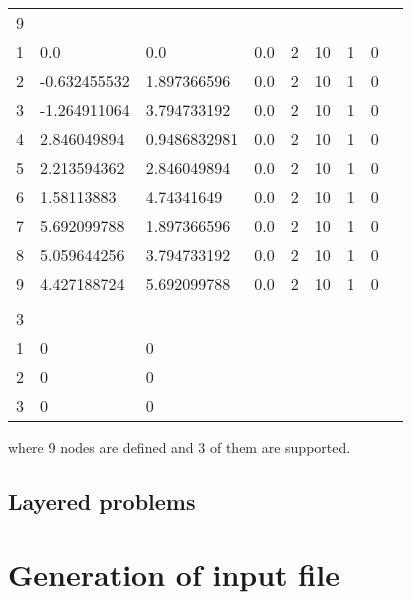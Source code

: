 \begin{center}
{\tt
\begin{tabular}{lllllllll}
9 &              &              &     &   &    &   &
\\
1 & 0.0          & 0.0          & 0.0 & 2 & 10 & 1 & 0
\\
2 & -0.632455532 & 1.897366596  & 0.0 & 2 & 10 & 1 & 0
\\
3 &-1.264911064  & 3.794733192  & 0.0 & 2 & 10 & 1 & 0
\\
4 & 2.846049894  & 0.9486832981 & 0.0 & 2 & 10 & 1 & 0
\\
5 & 2.213594362  & 2.846049894  & 0.0 & 2 & 10 & 1 & 0
\\
6 & 1.58113883   & 4.74341649   & 0.0 & 2 & 10 & 1 & 0
\\
7 & 5.692099788  & 1.897366596  & 0.0 & 2 & 10 & 1 & 0
\\
8 & 5.059644256  & 3.794733192  & 0.0 & 2 & 10 & 1 & 0
\\
9 & 4.427188724  & 5.692099788  & 0.0 & 2 & 10 & 1 & 0
\\
\\
3 &              &              &     &   &    &   &
\\
1 & 0            & 0            &     &   &    &   &
\\
2 & 0            & 0            &     &   &    &   &
\\
3 & 0            & 0            &     &   &    &   &
\\
\end{tabular}
}
\end{center}

where 9 nodes are defined and 3 of them are supported.

\section{Layered problems}

\chapter{Generation of input file}

